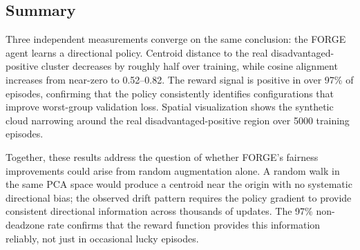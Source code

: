 \documentclass[12pt]{article}
\begin{document}
\subsection{Summary}
\label{sec:agent-learning-summary}

Three independent measurements converge on the same conclusion: the FORGE
agent learns a directional policy.
Centroid distance to the real disadvantaged-positive cluster decreases by
roughly half over training, while cosine alignment increases from near-zero
to 0.52--0.82.
The reward signal is positive in over 97\% of episodes, confirming that
the policy consistently identifies configurations that improve worst-group
validation loss.
Spatial visualization shows the synthetic cloud narrowing around the
real disadvantaged-positive region over 5000 training episodes.

Together, these results address the question of whether FORGE's fairness
improvements could arise from random augmentation alone.
A random walk in the same PCA space would produce a centroid near the
origin with no systematic directional bias; the observed drift pattern
requires the policy gradient to provide consistent directional information
across thousands of updates.
The 97\% non-deadzone rate confirms that the reward function provides
this information reliably, not just in occasional lucky episodes.
\end{document}

